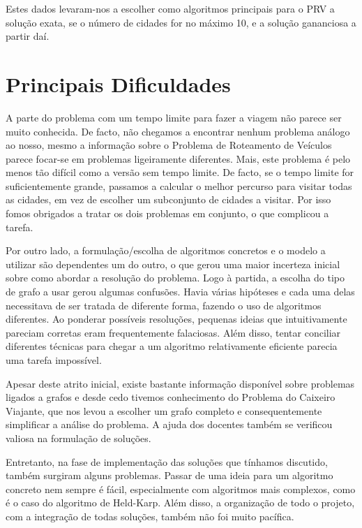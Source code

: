 \documentclass[12pt,a4paper,reqno]{report}
\numberwithin{equation}{section}
\begin{document}
Estes dados levaram-nos a escolher como algoritmos principais para o PRV a solução exata, se o número de cidades for no máximo 10, e a solução gananciosa a partir daí.

\chapter{Principais Dificuldades}

A parte do problema com um tempo limite para fazer a viagem não parece ser muito conhecida. De facto, não chegamos a encontrar nenhum problema análogo ao nosso, mesmo a informação sobre o Problema de Roteamento de Veículos parece focar-se em problemas ligeiramente diferentes. Mais, este problema é pelo menos tão difícil como a versão sem tempo limite. De facto, se o tempo limite for suficientemente grande, passamos a calcular o melhor percurso para visitar todas as cidades, em vez de escolher um subconjunto de cidades a visitar. Por isso fomos obrigados a tratar os dois problemas em conjunto, o que complicou a tarefa.

Por outro lado, a formulação/escolha de algoritmos concretos e o modelo a utilizar são dependentes um do outro, o que gerou uma maior incerteza inicial sobre como abordar a resolução do problema. Logo à partida, a escolha do tipo de grafo a usar gerou algumas confusões. Havia várias hipóteses e cada uma delas necessitava de ser tratada de diferente forma, fazendo o uso de algoritmos diferentes. Ao ponderar possíveis resoluções, pequenas ideias que intuitivamente pareciam corretas eram frequentemente falaciosas. Além disso, tentar conciliar diferentes técnicas para chegar a um algoritmo relativamente eficiente parecia uma tarefa impossível.

Apesar deste atrito inicial, existe bastante informação disponível sobre problemas ligados a grafos e desde cedo tivemos conhecimento do Problema do Caixeiro Viajante, que nos levou a escolher um grafo completo e consequentemente simplificar a análise do problema. A ajuda dos docentes também se verificou valiosa na formulação de soluções.

Entretanto, na fase de implementação das soluções que tínhamos discutido, também surgiram alguns problemas. Passar de uma ideia para um algoritmo concreto nem sempre é fácil, especialmente com algoritmos mais complexos, como é o caso do algoritmo de Held-Karp. Além disso, a organização de todo o projeto, com a integração de todas soluções, também não foi muito pacífica.
\end{document}
